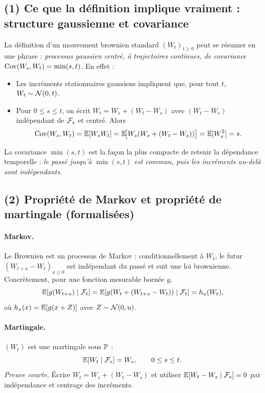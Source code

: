 
\subsection*{(1) Ce que la définition implique vraiment : structure gaussienne et covariance}
La définition d'un mouvement brownien standard $(W_t)_{t\ge 0}$ peut se résumer en une phrase :
\emph{processus gaussien centré, à trajectoires continues, de covariance $\mathrm{Cov}(W_s,W_t)=\min(s,t)$}.
En effet :
\begin{itemize}[leftmargin=*]
\item Les incréments stationnaires gaussiens impliquent que, pour tout $t$, $W_t\sim\mathcal{N}(0,t)$.
\item Pour $0\le s\le t$, on écrit $W_t=W_s+(W_t-W_s)$ avec $(W_t-W_s)$ indépendant de $\mathcal{F}_s$ et centré. Alors
\[
\mathrm{Cov}(W_s,W_t)=\mathbb{E}[W_sW_t]=\mathbb{E}\!\big[W_s(W_s+(W_t-W_s))\big]=\mathbb{E}[W_s^2]=s.
\]
\end{itemize}
La covariance $\min(s,t)$ est la façon la plus compacte de retenir la dépendance temporelle : \emph{le passé jusqu'à $\min(s,t)$ est commun, puis les incréments au-delà sont indépendants}.

\subsection*{(2) Propriété de Markov et propriété de martingale (formalisées)}
\paragraph{Markov.}
Le Brownien est un processus de Markov : conditionnellement à $W_t$, le futur $(W_{t+u}-W_t)_{u\ge 0}$ est indépendant du passé et suit une loi brownienne.
Concrètement, pour une fonction mesurable bornée $g$,
\[
\mathbb{E}[g(W_{t+u})\mid \mathcal{F}_t]=\mathbb{E}[g(W_t+(W_{t+u}-W_t))\mid \mathcal{F}_t]
=h_u(W_t),
\]
où $h_u(x)=\mathbb{E}[g(x+Z)]$ avec $Z\sim\mathcal{N}(0,u)$.

\paragraph{Martingale.}
$(W_t)$ est une martingale sous $\mathbb{P}$ :
\[
\mathbb{E}[W_t\mid \mathcal{F}_s]=W_s,\qquad 0\le s\le t.
\]
\emph{Preuve courte.} Écrire $W_t=W_s+(W_t-W_s)$ et utiliser $\mathbb{E}[W_t-W_s\mid \mathcal{F}_s]=0$ par indépendance et centrage des incréments.

